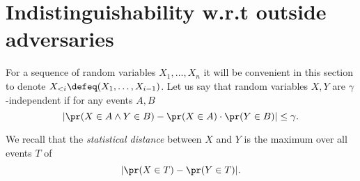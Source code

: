\documentclass[11pt]{article}
\numberwithin{equation}{section} %
\numberwithin{figure}{section} %
\newtheorem{claim}[thm]{Claim}
\newcommand{\inp}{\ensuremath{\mathsf{inp}}\xspace}
\newcommand{\out}{\ensuremath{\mathsf{out}}\xspace}
\begin{document}
% 
% 
%  
\section{Indistinguishability w.r.t outside adversaries}\label{sec:indist}
For a sequence of random variables $X_1,\ldots,X_n$ it will be convenient in this section to denote  
$X_{<i}\defeq (X_1,\ldots,X_{i-1})$.
Let us say that random variables $X,Y$ are $\gamma$-independent if for
any events $A,B$
\[|\pr(X\in A \wedge Y\in B)-\pr(X\in A)\cdot \pr(Y\in B)|\leq \gamma.\]

We recall that the \emph{statistical distance} between $X$ and $Y$ is the maximum over all events $T$ of
\[|\pr(X\in T) - \pr(Y\in T)|.\]
\end{document}
